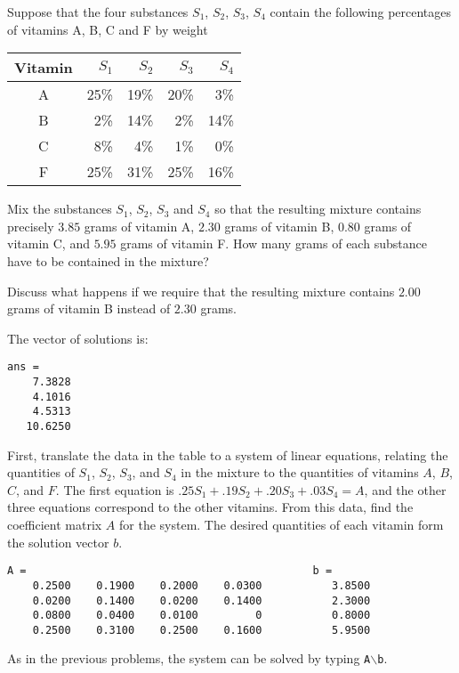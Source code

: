 \documentclass{ximera}
\begin{document}
\begin{exercise} \label{c2.1.7}
Suppose that the four substances $S_1$, $S_2$, $S_3$, $S_4$
contain the following percentages of vitamins A, B, C and F by
weight
\begin{center}
\begin{tabular}{|c||r|r|r|r|}
\hline
Vitamin   & $S_1$ & $S_2$ & $S_3$ & $S_4$\\
\hline
 A & 25\% &    19\% &    20\% &    3\% \\
 B &  2\% &    14\% &     2\% &   14\% \\
 C &  8\% &     4\% &     1\% &     0\% \\
 F & 25\% &    31\% &    25\% &    16\% \\
\hline
\end{tabular}
\end{center}
Mix the substances $S_1$, $S_2$, $S_3$ and $S_4$ so that the
resulting mixture contains precisely $3.85$ grams of vitamin A,
$2.30$ grams of vitamin B, $0.80$ grams of vitamin C, and $5.95$
grams of vitamin F.  How many grams of each substance have to be
contained in the mixture?

Discuss what happens if we require that the resulting mixture contains
$2.00$ grams of vitamin B instead of $2.30$ grams.

\begin{solution}
\ans The vector of solutions is:
\begin{verbatim}
ans =
    7.3828
    4.1016
    4.5313
   10.6250
\end{verbatim}
\soln First, translate the data in the table to a system of linear
equations, relating the quantities of $S_1$, $S_2$, $S_3$, and $S_4$
in the mixture to the quantities of vitamins $A$, $B$, $C$, and $F$. 
The first equation is $.25S_1 + .19S_2 + .20S_3 + .03S_4 = A$, and
the other three equations correspond to the other vitamins.  From
this data, find the coefficient matrix $A$ for the system.  The desired
quantities of each vitamin form the solution vector $b$.
\begin{verbatim}
A =                                             b =
    0.2500    0.1900    0.2000    0.0300           3.8500
    0.0200    0.1400    0.0200    0.1400           2.3000
    0.0800    0.0400    0.0100         0           0.8000
    0.2500    0.3100    0.2500    0.1600           5.9500
\end{verbatim}
As in the previous problems, the system can be solved by
typing {\tt A}$\backslash${\tt b}.


\end{solution}
\end{exercise}
\end{document}
